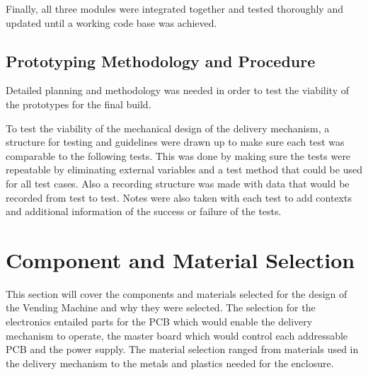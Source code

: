 \documentclass[a4paper,11pt]{article}
\numberwithin{figure}{section}
\numberwithin{table}{section}
\begin{document}
Finally, all three modules were integrated together and tested thoroughly and updated until a working code base was achieved. 

\subsection[Prototyping Methodology and Procedure]{Prototyping Methodology and Procedure%
}

Detailed planning and methodology was needed in order to test the viability of the prototypes for the final build.

To test the viability of the mechanical design of the delivery mechanism, a structure for testing and guidelines were drawn up to make sure each test was comparable to the following tests. This was done by making sure the tests were repeatable by eliminating external variables and a test method that could be used for all test cases. Also a recording structure was made with data that would be recorded from test to test. Notes were also taken with each test to add contexts and additional information of the success or failure of the tests.

\newpage
\section{Component and Material Selection}\thispagestyle{sectionstart}
This section will cover the components and materials selected for the design of the Vending Machine and why they were selected. The selection for the electronics entailed parts for the PCB which would enable the delivery mechanism to operate, the master board which would control each addressable PCB and the power supply. The material selection ranged from materials used in the delivery mechanism to the metals and plastics needed for the enclosure.
\end{document}
